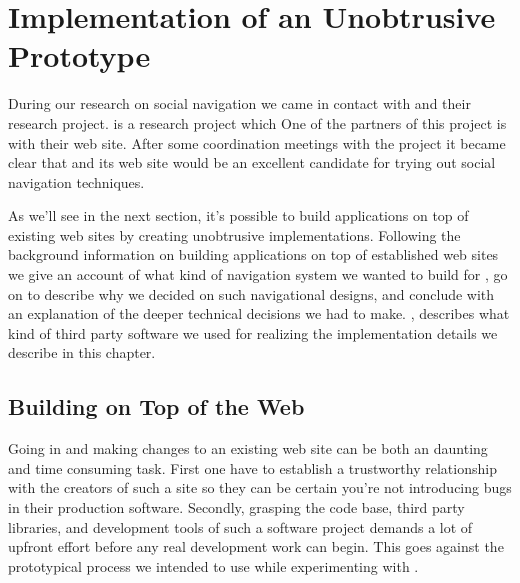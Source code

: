 \chapter{Implementation of an Unobtrusive Prototype}
\label{chapter:implementation}

During our research on social navigation we came in contact with
%
and their  research project.%
 is a research project which
One of the partners of this project is %
with their \urort{} web site. After some coordination meetings with the
 project it became clear that \urort{} and its web site
would be an excellent candidate for trying out social navigation techniques.

As we'll see in the next section, it's possible to build applications on top
of existing web sites by creating unobtrusive implementations.
Following the background information on building applications
on top of established web sites we give an account of
what kind of navigation system we wanted to build for \urort{}, go on to
describe why we decided on such navigational designs, and conclude with an
explanation of the deeper technical decisions we had to make.
,
describes what kind of third party software we used for realizing the
implementation details we describe in this chapter.

\section{Building on Top of the Web}
\label{section:implementation.building.on.top.of.the.web}

Going in and making changes to an existing web site can be both an
daunting and time consuming task. First one have to establish a trustworthy
relationship with the creators of such a site so they can be certain
you're not introducing bugs in their production software. Secondly, grasping
the code base, third party libraries, and development tools of such a software
project demands a lot of upfront effort before any real development work can
begin. This goes against the prototypical process we intended to use while
experimenting with \urort{}.

